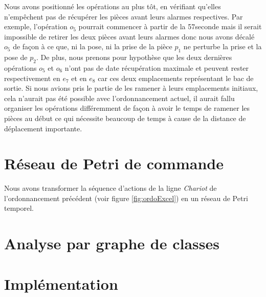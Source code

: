 Nous avons positionné les opérations au plus tôt, en vérifiant qu'elles n'empêchent pas de récupérer les pièces avant leurs alarmes respectives. Par exemple, l'opération $o_5$ pourrait commencer à partir de la 57\ieme seconde mais il serait impossible de retirer les deux pièces avant leurs alarmes donc nous avons décalé $o_5$ de façon à ce que, ni la pose, ni la prise de la pièce $p_1$ ne perturbe la prise et la pose de $p_2$. De plus, nous prenons pour hypothèse que les deux dernières opérations $o_5$ et $o_6$ n'ont pas de date récupération maximale et peuvent rester respectivement en $e_7$ et en $e_8$ car ces deux emplacements représentant le bac de sortie. Si nous avions pris le partie de les ramener à leurs emplacements initiaux, cela n'aurait pas été possible avec l'ordonnancement actuel, il aurait fallu organiser les opérations différemment de façon à avoir le temps de ramener les pièces au début ce qui nécessite beaucoup de temps à cause de la distance de déplacement importante.

\section{Réseau de Petri de commande}
Nous avons transformer la séquence d'actions de la ligne \emph{Chariot} de l'ordonnancement précédent (voir figure \ref{fig:ordoExcel}) en un réseau de Petri temporel. 
\section{Analyse par graphe de classes}

\section{Implémentation}